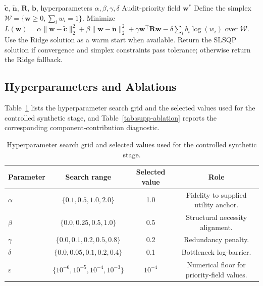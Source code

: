 \documentclass[pdflatex,sn-mathphys-num]{sn-jnl}
\begin{document}
\begin{algorithm}[ht]
\caption{SC-FMA QP Calibration}
\label{alg:supp-scfma-qp}
\begin{algorithmic}[1]
\Require $\tilde{\mathbf{c}}$, $\tilde{\mathbf{n}}$, $\mathbf{R}$, $\mathbf{b}$, hyperparameters $\alpha,\beta,\gamma,\delta$
\Ensure Audit-priority field $\mathbf{w}^*$
\State Define the simplex $\mathcal{W}=\{\mathbf{w}\ge 0,\sum_i w_i=1\}$.
\State Minimize $L(\mathbf{w})=\alpha\|\mathbf{w}-\tilde{\mathbf{c}}\|_2^2+\beta\|\mathbf{w}-\tilde{\mathbf{n}}\|_2^2+\gamma\mathbf{w}^\top\mathbf{R}\mathbf{w}-\delta\sum_i b_i\log(w_i)$ over $\mathcal{W}$.
\State Use the Ridge solution as a warm start when available.
\State Return the SLSQP solution if convergence and simplex constraints pass tolerance; otherwise return the Ridge fallback.
\end{algorithmic}
\end{algorithm}

\subsection{Hyperparameters and Ablations}
\label{app:hyperparameters-ablation}

Table~\ref{tab:supp-hyperparameters} lists the hyperparameter search grid and the selected values used for the controlled synthetic stage, and Table~\ref{tab:supp-ablation} reports the corresponding component-contribution diagnostic.

\begin{table}[ht]
\caption{Hyperparameter search grid and selected values used for the controlled synthetic stage.}
\label{tab:supp-hyperparameters}
\centering
\small
\begin{tabular}{lccc}
\toprule
\textbf{Parameter} & \textbf{Search range} & \textbf{Selected value} & \textbf{Role} \\
\midrule
$\alpha$ & $\{0.1,0.5,1.0,2.0\}$ & 1.0 & Fidelity to supplied utility anchor. \\
$\beta$ & $\{0.0,0.25,0.5,1.0\}$ & 0.5 & Structural necessity alignment. \\
$\gamma$ & $\{0.0,0.1,0.2,0.5,0.8\}$ & 0.2 & Redundancy penalty. \\
$\delta$ & $\{0.0,0.05,0.1,0.2,0.4\}$ & 0.1 & Bottleneck log-barrier. \\
$\varepsilon$ & $\{10^{-6},10^{-5},10^{-4},10^{-3}\}$ & $10^{-4}$ & Numerical floor for priority-field values. \\
\bottomrule
\end{tabular}
\end{table}
\end{document}
